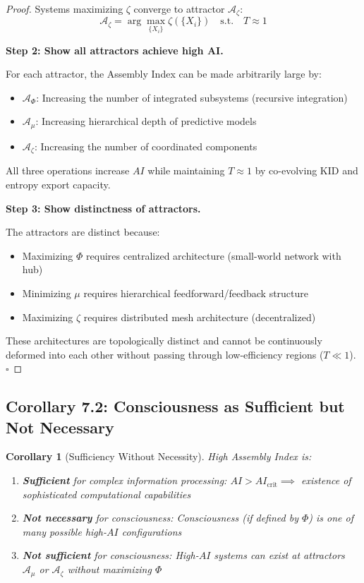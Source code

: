 \documentclass[11pt,a4paper]{article}
\newtheorem{corollary}[theorem]{Corollary}
\begin{document}
\begin{proof}
Systems maximizing $\zeta$ converge to attractor $\mathcal{A}_{\zeta}$:
\begin{equation}
\mathcal{A}_{\zeta} = \arg\max_{\{X_i\}} \zeta(\{X_i\}) \quad \text{s.t.} \quad T \approx 1
\end{equation}

\textbf{Step 2: Show all attractors achieve high AI.}

For each attractor, the Assembly Index can be made arbitrarily large by:
\begin{itemize}
\item $\mathcal{A}_{\Phi}$: Increasing the number of integrated subsystems (recursive integration)
\item $\mathcal{A}_{\mu}$: Increasing hierarchical depth of predictive models
\item $\mathcal{A}_{\zeta}$: Increasing the number of coordinated components
\end{itemize}

All three operations increase $AI$ while maintaining $T \approx 1$ by co-evolving KID and entropy export capacity.

\textbf{Step 3: Show distinctness of attractors.}

The attractors are distinct because:
\begin{itemize}
\item Maximizing $\Phi$ requires centralized architecture (small-world network with hub)
\item Minimizing $\mu$ requires hierarchical feedforward/feedback structure
\item Maximizing $\zeta$ requires distributed mesh architecture (decentralized)
\end{itemize}

These architectures are topologically distinct and cannot be continuously deformed into each other without passing through low-efficiency regions ($T \ll 1$).
\hfill $\square$
\end{proof}

\subsection{Corollary 7.2: Consciousness as Sufficient but Not Necessary}

\begin{corollary}[Sufficiency Without Necessity]
High Assembly Index is:
\begin{enumerate}[label=(\roman*)]
\item \textbf{Sufficient} for complex information processing: $AI > AI_{\text{crit}} \implies$ existence of sophisticated computational capabilities
\item \textbf{Not necessary} for consciousness: Consciousness (if defined by $\Phi$) is one of many possible high-$AI$ configurations
\item \textbf{Not sufficient} for consciousness: High-$AI$ systems can exist at attractors $\mathcal{A}_{\mu}$ or $\mathcal{A}_{\zeta}$ without maximizing $\Phi$
\end{enumerate}
\end{corollary}
\end{document}
